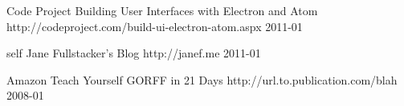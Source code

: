 


\begin{cventries}

  \cventry
    {Code Project} %
    {Building User Interfaces with Electron and Atom} %
    {http://codeproject.com/build-ui-electron-atom.aspx} %
    {2011-01} %
    {}


  \cventry
    {self} %
    {Jane Fullstacker's Blog} %
    {http://janef.me} %
    {2011-01} %
    {}


  \cventry
    {Amazon} %
    {Teach Yourself GORFF in 21 Days} %
    {http://url.to.publication.com/blah} %
    {2008-01} %
    {}


\end{cventries}

